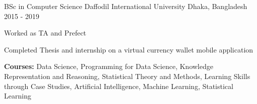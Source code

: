 

\begin{cventries}

  \cventry
    {BSc in Computer Science} %
    {Daffodil International University} %
    {Dhaka, Bangladesh} %
    {2015 - 2019} %
    {
      \begin{cvitems} %
        \item {Worked as TA and Prefect}
        \item {Completed Thesis and internship on a virtual currency wallet mobile application}
        \item {\textbf{Courses:} Data Science, Programming for Data Science, Knowledge Representation and Reasoning, Statistical Theory and Methods, Learning Skills through Case Studies, Artificial Intelligence, Machine Learning, Statistical Learning}
      \end{cvitems}
    }

\end{cventries}
